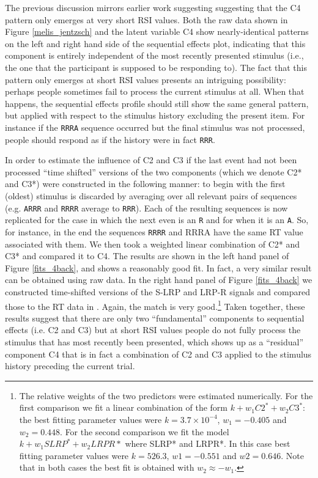 \documentclass{apa}[12pt]
\newcommand{\stimulus}[1]{\texttt{#1}}
\begin{document}
The previous discussion mirrors earlier work suggesting suggesting that the C4 pattern only emerges at very short RSI values. Both the raw data shown in Figure \ref{melis_jentzsch} and the latent variable C4 show nearly-identical patterns on the left and right hand side of the sequential effects plot, indicating that this component is entirely independent of the most recently presented stimulus (i.e., the one that the participant is supposed to be responding to). The fact that this pattern only emerges at short RSI values presents an intriguing possibility: perhaps people sometimes fail to process the current stimulus at all. When that happens, the sequential effects profile should still show the same general pattern, but applied with respect to the stimulus history excluding the present item. For instance if the \stimulus{RRRA} sequence occurred but the final stimulus was not processed, people should respond as if the history were in fact \stimulus{RRR}.

In order to estimate the influence of C2 and C3 if the last event had not been processed ``time shifted'' versions of the two components (which we denote C2* and C3*) were constructed in the following manner: to begin with the first (oldest) stimulus is discarded by averaging over all relevant pairs of sequences (e.g. \stimulus{ARRR} and \stimulus{RRRR} average to \stimulus{RRR}). Each of the resulting sequences is now replicated for the case in which the next even is an \stimulus{R} and for when it is an \stimulus{A}. So, for instance, in the end the sequences \stimulus{RRRR} and {RRRA} have the same RT value associated with them. We then took a weighted linear combination of C2* and C3* and compared it to C4. The results are shown in the left hand panel of Figure \ref{fits_4back}, and shows a reasonably good fit. In fact, a very similar result can be obtained using raw data. In the right hand panel of Figure \ref{fits_4back} we constructed time-shifted versions of the S-LRP and LRP-R signals and compared those to the RT data in . Again, the match is very good.\footnote{The relative weights of the two predictors were estimated numerically. For the first comparison we fit a linear combination  of the form $k + w_1 C2^*+ w_2 C3^*$: the best fitting parameter values were $k=3.7\times 10^{-4}$, $w_1 = -0.405$ and $w_2 = 0.448$. For the second comparison we fit the model $k + w_1 SLRP^* + w_2 LRPR*$ where SLRP* and LRPR*. In this case best fitting parameter values were $k = 526.3$, $w1 = -0.551$ and $w2 = 0.646$. Note that in both cases the best fit is obtained with  $w_2 \approx -w_1$.} Taken together, these results suggest that there are only two ``fundamental'' components to sequential effects (i.e. C2 and C3) but at short RSI values people do not fully process the stimulus that has most recently been presented, which shows up as a ``residual'' component C4 that is in fact a combination of C2 and C3 applied to the stimulus history preceding the current trial.
\end{document}

